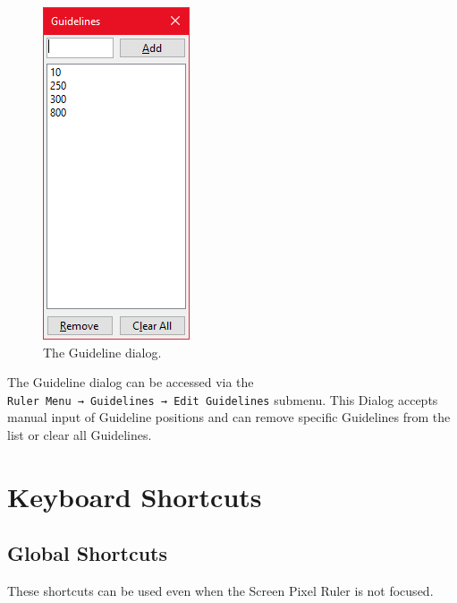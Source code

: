 \documentclass[
]{book}
\begin{document}
\begin{figure}
\centering
\includegraphics{images/guideline-dialog.png}
\caption{\label{fig:unnamed-chunk-3}The Guideline dialog.}
\end{figure}

The Guideline dialog can be accessed via the \texttt{Ruler\ Menu\ →\ Guidelines\ →\ Edit\ Guidelines} submenu.
This Dialog accepts manual input of Guideline positions and can remove specific Guidelines from the list or clear all Guidelines.

\hypertarget{keyboard}{%
\chapter{Keyboard Shortcuts}\label{keyboard}}

\hypertarget{global-shortcuts}{%
\section{Global Shortcuts}\label{global-shortcuts}}

These shortcuts can be used even when the Screen Pixel Ruler is not focused.
\end{document}
